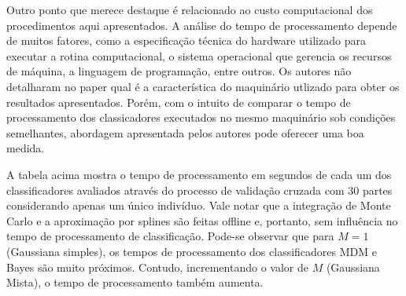 \documentclass[a4paper,titlepage]{article}
\begin{document}
Outro ponto que merece destaque é relacionado ao custo computacional dos
procedimentos aqui apresentados. A análise do tempo de processamento depende
de muitos fatores, como a especificação técnica do hardware utilizado para
executar a rotina computacional, o sistema operacional que gerencia os recursos
de máquina, a linguagem de programação, entre outros. Os autores não detalharam
no paper qual é a característica do maquinário utlizado para obter os resultados
apresentados. Porém, com o intuito de comparar o tempo de processamento dos
classicadores executados no mesmo maquinário sob condições semelhantes,
abordagem apresentada pelos autores pode oferecer uma boa medida.

\begin{center}
  \vspace{1em}
  \vspace{1em}
\end{center}

A tabela acima mostra o tempo de processamento em segundos de cada um dos
classificadores avaliados através do processo de validação cruzada com 30
partes considerando apenas um único indivíduo. Vale notar que a integração
de Monte Carlo e a aproximação por splines são feitas offline e, portanto,
sem influência no tempo de processamento de classificação. Pode-se observar que
para $M=1$ (Gaussiana simples), os tempos de processamento dos classificadores
MDM e Bayes são muito próximos. Contudo, incrementando o valor de $M$
(Gaussiana Mista), o tempo de processamento também aumenta.

\begin{center}
  \vspace{1em}
  \vspace{1em}
\end{center}
\end{document}
